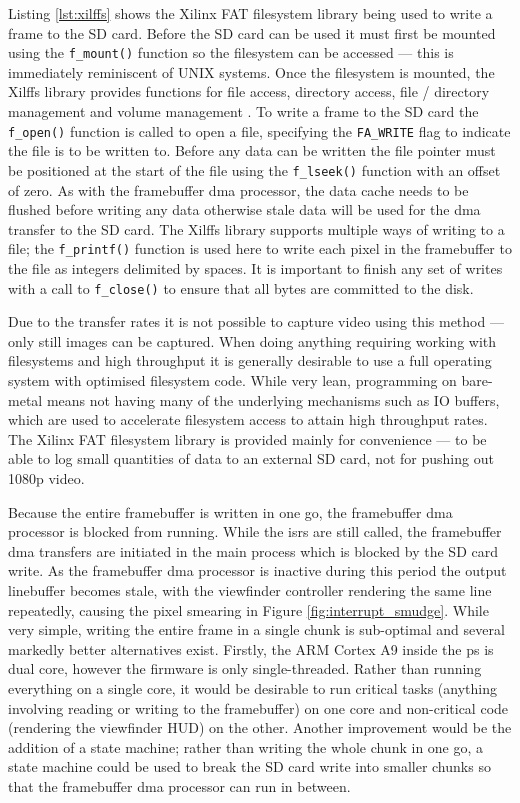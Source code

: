 Listing \ref{lst:xilffs} shows the Xilinx FAT filesystem library being used to write a frame to the SD card. Before the SD card can be used it must first be mounted using the \texttt{f\_mount()} function so the filesystem can be accessed --- this is immediately reminiscent of UNIX systems. Once the filesystem is mounted, the Xilffs library provides functions for file access, directory access, file / directory management and volume management \cite{xilinx:ug643}. To write a frame to the SD card the \texttt{f\_open()} function is called to open a file, specifying the \texttt{FA\_WRITE} flag to indicate the file is to be written to. Before any data can be written the file pointer must be positioned at the start of the file using the \texttt{f\_lseek()} function with an offset of zero. As with the framebuffer \gls{dma} processor, the data cache needs to be flushed before writing any data otherwise stale data will be used for the \gls{dma} transfer to the SD card. The Xilffs library supports multiple ways of writing to a file; the \texttt{f\_printf()} function is used here to write each pixel in the framebuffer to the file as integers delimited by spaces. It is important to finish any set of writes with a call to \texttt{f\_close()} to ensure that all bytes are committed to the disk.

Due to the transfer rates it is not possible to capture video using this method --- only still images can be captured. When doing anything requiring working with filesystems and high throughput it is generally desirable to use a full operating system with optimised filesystem code. While very lean, programming on bare-metal means not having many of the underlying mechanisms such as IO buffers, which are used to accelerate filesystem access to attain high throughput rates. The Xilinx FAT filesystem library is provided mainly for convenience --- to be able to log small quantities of data to an external SD card, not for pushing out 1080p video.

Because the entire framebuffer is written in one go, the framebuffer \gls{dma} processor is blocked from running. While the \glspl{isr} are still called, the framebuffer \gls{dma} transfers are initiated in the main process which is blocked by the SD card write. As the framebuffer \gls{dma} processor is inactive during this period the output linebuffer becomes stale, with the viewfinder controller rendering the same line repeatedly, causing the pixel smearing in Figure \ref{fig:interrupt_smudge}. While very simple, writing the entire frame in a single chunk is sub-optimal and several markedly better alternatives exist. Firstly, the ARM Cortex A9 inside the \gls{ps} is dual core, however the firmware is only single-threaded. Rather than running everything on a single core, it would be desirable to run critical tasks  (anything involving reading or writing to the framebuffer) on one core and non-critical code (rendering the viewfinder HUD) on the other. Another improvement would be the addition of a state machine; rather than writing the whole chunk in one go, a state machine could be used to break the SD card write into smaller chunks so that the framebuffer \gls{dma} processor can run in between.

